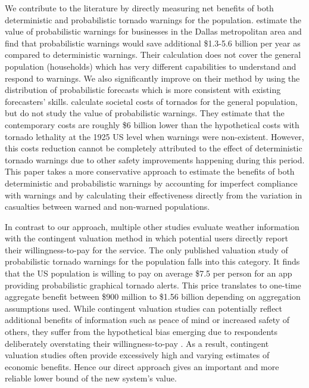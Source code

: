 \documentclass{ametsocV6.1}
\newcommand{\add}[1]{{\color{red}#1}}
\begin{document}
We contribute to the literature by directly measuring net benefits of both deterministic and probabilistic tornado warnings for the population. \add{\cite{howard_firm_2021} estimate the value of probabilistic warnings for businesses in the Dallas metropolitan area and find that probabilistic warnings would save additional \$1.3-5.6 billion per year as compared to deterministic warnings. Their calculation does not cover the general population (households) which has very different capabilities to understand and respond to warnings. We also significantly improve on their method by using the distribution of probabilistic forecasts which is more consistent with existing forecasters' skills.  \citet{simmons_economic_2013} calculate societal costs of tornados for the general population, but do not study the value of probabilistic warnings.} They estimate that the contemporary costs are roughly \$6 billion lower than the hypothetical costs with tornado lethality at the 1925 US level when warnings were non-existent. However, this costs reduction cannot be completely attributed to the effect of deterministic tornado warnings due to other safety improvements happening during this period. This paper takes a more conservative approach to estimate the benefits of both deterministic and probabilistic warnings by accounting for imperfect compliance with warnings and by calculating their effectiveness directly from the variation in casualties between warned and non-warned populations. 

In contrast to our approach, multiple other studies evaluate weather information \citep{lazo_economic_2002, lazo_300_2009, lazo_valuing_2011, wehde_public_2021-1} with the contingent valuation method in which potential users directly report their willingness-to-pay for the service. \add{The only published valuation study of probabilistic tornado warnings for the population \citet{wehde_public_2021-1} falls into this category. It finds} that the US population is willing to pay on average \$7.5 per person for an app providing probabilistic graphical tornado alerts. This price translates to one-time aggregate benefit between \$900 million to \$1.56 billion depending on aggregation assumptions used. While contingent valuation studies can potentially reflect additional benefits of information such as peace of mind or increased safety of others, they suffer from the hypothetical bias emerging due to respondents deliberately overstating their willingness-to-pay \citep{blumenschein_eliciting_2008, johnston_contemporary_2017}.  As a result, contingent valuation studies often provide excessively high and varying estimates of economic benefits. Hence our direct approach gives an important and more reliable lower bound of the new system's value. 
\end{document}
